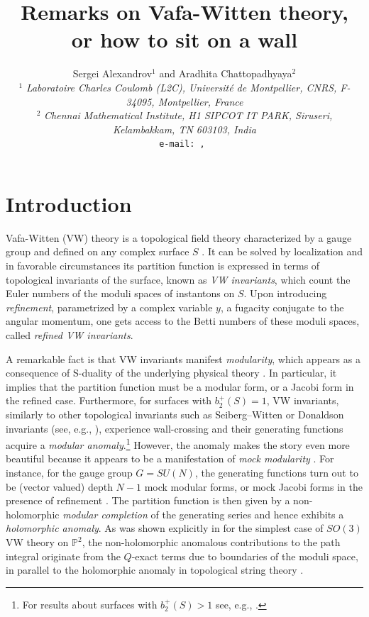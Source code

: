\documentclass[12pt,letterpaper]{JHEP3}
\title{Remarks on Vafa-Witten theory, \\ or how to sit on a wall
	}
\author{Sergei Alexandrov$^1$ and Aradhita Chattopadhyaya$^2$ 
\\
$^1$ {\it Laboratoire Charles Coulomb (L2C), Universit\'e de Montpellier,
	CNRS, F-34095, Montpellier, France}\\
$^2$ {\it Chennai Mathematical Institute, H1 SIPCOT IT PARK, Siruseri, Kelambakkam, TN 603103, India}
\\
\vspace*{2mm} {\tt e-mail:
	\email{sergey.alexandrov@umontpellier.fr}, \email{aradhitac@cmi.ac.in}
}

\vspace*{-3mm}

}
\newcommand{\IP}{\mathds{P}}
\begin{document}
	

	
	
\section{Introduction}
\label{sec-intro}

Vafa-Witten (VW) theory is a topological field theory characterized by a gauge group 
and defined on any complex surface $S$ \cite{Vafa:1994tf}. It can be solved by localization 
and in favorable circumstances its partition function is expressed in terms of topological invariants of the surface,
known as {\it VW invariants}, which count the Euler numbers of the moduli spaces of instantons on $S$.
Upon introducing {\it refinement}, parametrized by a complex variable $y$, a fugacity conjugate to the angular momentum, 
one gets access to the Betti numbers of these moduli spaces, called {\it refined VW invariants}.

A remarkable fact is that VW invariants manifest {\it modularity}, which appears as a consequence of S-duality 
of the underlying physical theory \cite{Vafa:1994tf}. 
In particular, it implies that the partition function must be a modular form, 
or a Jacobi form in the refined case.
Furthermore, for surfaces with $b_2^+(S)=1$, 
VW invariants, similarly to other topological invariants such as 
Seiberg–Witten or Donaldson invariants (see, e.g., \cite{Manschot:2023rdh}),
experience wall-crossing and their generating functions acquire a {\it modular anomaly}.\footnote{For results about surfaces with $b_2^+(S)>1$ see, e.g., 
	\cite{Vafa:1994tf,Labastida:1999ij,gottsche2017virtual,Laarakker:2018isn,Thomas:2018lvm,Gottsche:2018meg,Gottsche:2021dye}.}
However, the anomaly makes the story even more beautiful because it appears to be a manifestation of {\it mock modularity} 
\cite{Zwegers-thesis,MR2605321,Alexandrov:2025sig}.
For instance, for the gauge group $G=SU(N)$, the generating functions turn out to be (vector valued) depth $N-1$ mock modular forms, 
or mock Jacobi forms in the presence of refinement \cite{Vafa:1994tf,Minahan:1998vr,Manschot:2017xcr,Alexandrov:2019rth}.
The partition function is then given by a non-holomorphic {\it modular completion} of 
the generating series and hence exhibits a {\it holomorphic anomaly}.
As was shown explicitly in \cite{Dabholkar:2020fde} for the simplest case of $SO(3)$ VW theory on $\IP^2$, 
the non-holomorphic anomalous contributions to the path integral 
originate from the $Q$-exact terms due to boundaries of the moduli space, 
in parallel to the holomorphic anomaly in topological string theory \cite{Bershadsky:1993ta}.
\end{document}
